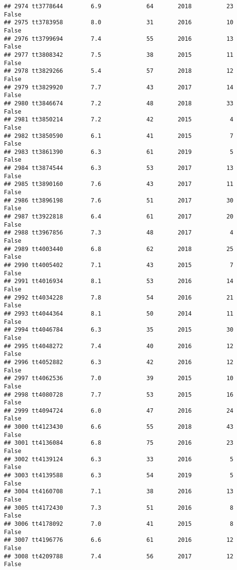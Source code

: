 \documentclass[
]{article}
\begin{document}
\begin{verbatim}
## 2974 tt3778644        6.9             64       2018          23   False
## 2975 tt3783958        8.0             31       2016          10   False
## 2976 tt3799694        7.4             55       2016          13   False
## 2977 tt3808342        7.5             38       2015          11   False
## 2978 tt3829266        5.4             57       2018          12   False
## 2979 tt3829920        7.7             43       2017          14   False
## 2980 tt3846674        7.2             48       2018          33   False
## 2981 tt3850214        7.2             42       2015           4   False
## 2982 tt3850590        6.1             41       2015           7   False
## 2983 tt3861390        6.3             61       2019           5   False
## 2984 tt3874544        6.3             53       2017          13   False
## 2985 tt3890160        7.6             43       2017          11   False
## 2986 tt3896198        7.6             51       2017          30   False
## 2987 tt3922818        6.4             61       2017          20   False
## 2988 tt3967856        7.3             48       2017           4   False
## 2989 tt4003440        6.8             62       2018          25   False
## 2990 tt4005402        7.1             43       2015           7   False
## 2991 tt4016934        8.1             53       2016          14   False
## 2992 tt4034228        7.8             54       2016          21   False
## 2993 tt4044364        8.1             50       2014          11   False
## 2994 tt4046784        6.3             35       2015          30   False
## 2995 tt4048272        7.4             40       2016          12   False
## 2996 tt4052882        6.3             42       2016          12   False
## 2997 tt4062536        7.0             39       2015          10   False
## 2998 tt4080728        7.7             53       2015          16   False
## 2999 tt4094724        6.0             47       2016          24   False
## 3000 tt4123430        6.6             55       2018          43   False
## 3001 tt4136084        6.8             75       2016          23   False
## 3002 tt4139124        6.3             33       2016           5   False
## 3003 tt4139588        6.3             54       2019           5   False
## 3004 tt4160708        7.1             38       2016          13   False
## 3005 tt4172430        7.3             51       2016           8   False
## 3006 tt4178092        7.0             41       2015           8   False
## 3007 tt4196776        6.6             61       2016          12   False
## 3008 tt4209788        7.4             56       2017          12   False

\end{verbatim}
\end{document}
